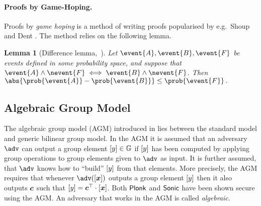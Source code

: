 \documentclass[runningheads,11pt]{llncs}
\def\vec#1{\mathchoice{\mbox{\boldmath$\displaystyle#1$}}
{\mbox{\boldmath$\textstyle#1$}} {\mbox{\boldmath$\scriptstyle#1$}}
{\mbox{\boldmath$\scriptscriptstyle#1$}}}
\newtheorem{lemma}[theorem]{Lemma} \newtheorem{corollary}[theorem]{Corollary}
\theoremstyle{definition} \newtheorem{definition}[theorem]{Definition}
\begin{document}

\paragraph{Proofs by Game-Hoping.}
Proofs by \emph{game hoping} is a method of writing proofs popularised by
e.g.~Shoup \cite{EPRINT:Shoup04} and Dent \cite{EPRINT:Dent06c}. The method
relies on the following lemma.

\begin{lemma}[Difference lemma,~{\cite[Lemma 1]{EPRINT:Shoup04}}]
	\label{lem:difference_lemma}
	Let $\event{A}, \event{B}, \event{F}$ be events defined in some probability
	space, and suppose that $\event{A} \land \nevent{F} \iff \event{B}
		\land \nevent{F}$.  Then 
	$
		\abs{\prob{\event{A}} - \prob{\event{B}}} \leq \prob{\event{F}}\,.
	$
\end{lemma}
\subsection{Algebraic Group Model}
The algebraic group model (AGM) introduced in \cite{C:FucKilLos18} lies between
the standard model and generic bilinear group model. In the AGM it is assumed
that an adversary $\adv$ can output a group element $\left[y\right] \in \mathbb{G}$ if
$\left[y\right]$ has been computed by applying group operations to group elements
given to $\adv$ as input. It is further assumed, that $\adv$ knows how to
``build'' $\left[y\right]$ from that elements. More precisely, the AGM requires that
whenever $\adv(\gnone{\vec{x}})$ outputs a group element $\left[y\right]$ then it
also outputs $\vec{c}$ such that $\gnone{y} = \vec{c}^\top \cdot
\gnone{\vec{x}}$. Both $\textnormal{\textsf{Plonk}}$ and ${\textnormal{\textsf{Sonic}}}$ have been shown secure using the
AGM. An adversary that works in the AGM is called \emph{algebraic}.
\end{document}
